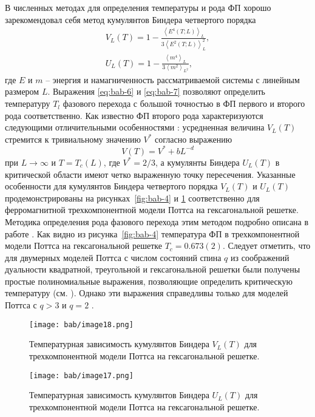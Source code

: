 В численных методах для определения температуры и рода ФП хорошо зарекомендовал себя метод кумулянтов Биндера четвертого порядка \cite{bib:bab-12}
\begin{gather}
    \label{eq:bab-6}
    V_L(T) = 1 - \frac{\left<E^4(T; L)\right>_L}{3\left<E^2(T; L)\right>_L^2}, \\
    \label{eq:bab-7}
    U_L(T) = 1 - \frac{\left<m^4\right>_L}{3\left<m^2\right>_{L^2}},
\end{gather}
где $E$ и $m$ -- энергия и намагниченность рассматриваемой системы с линейным размером $L$. Выражения \eqref{eq:bab-6} и \eqref{eq:bab-7} позволяют определить температуру $T_l$ фазового перехода с большой точностью в ФП первого и второго рода соответственно. Как известно ФП второго рода характеризуются следующими отличительными особенностями \cite{bib:bab-13}: усредненная величина $V_L(T)$ стремится к тривиальному значению $V^*$ согласно выражению
\begin{equation*}
    V(T) = V^* + bL^{-d}
\end{equation*}
при $L \to \infty$ и $T=T_c(L)$, где $V^* = 2/3$, а кумулянты Биндера $U_L(T)$ в критической области имеют четко выраженную точку пересечения. Указанные особенности для кумулянтов Биндера четвертого порядка $V_L(T)$ и $U_L(T)$ продемонстрированы на рисунках~\ref{fig:bab-4} и \ref{fig:bab-5} соответственно для ферромагнитной трехкомпонентной модели Поттса на гексагональной решетке. Методика определения рода фазового перехода этим методом подробно описана в работе \cite{bib:bab-14}. Как видно из рисунка~\ref{fig:bab-4} температура ФП в трехкомпонентной модели Поттса на гексагональной решетке $T_c=0.673(2)$. Следует отметить, что для двумерных моделей Поттса с числом состояний спина $q$ из соображений дуальности квадратной, треугольной и гексагональной решетки были получены простые полиномиальные выражения, позволяющие определить критическую температуру (см. \cite{bib:bab-8}). Однако эти выражения справедливы только для моделей Поттса с $q>3$ и $q=2$ \cite{bib:bab-9}.
\begin{figure}[ht]
    \begin{minipage}[c]{0.45\linewidth}
        \texttt{[image: bab/image18.png]}
        \caption{Температурная зависимость кумулянтов Биндера $V_L(T)$ для трехкомпонентной модели Поттса на гексагональной решетке.}
        \label{fig:bab-4}
    \end{minipage}
    \hfill
    \begin{minipage}[c]{0.45\linewidth}
        \texttt{[image: bab/image17.png]}
        \caption{Температурная зависимость кумулянтов Биндера $U_L(T)$ для трехкомпонентной модели Поттса на гексагональной решетке.}
        \label{fig:bab-5}
    \end{minipage}
\end{figure}

